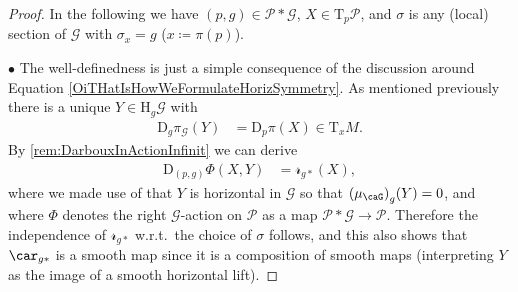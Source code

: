 \documentclass[reqno,a4paper,oneside]{amsart}
\newcommand\mutot{\mu_\caG}
\theoremstyle{plain}
\theoremstyle{remark}
\theoremstyle{definition}
\begin{document}
\begin{proof}
\leavevmode\newline
In the following we have $(p, g) \in \mathcal{P} * \mathcal{G}$, $X \in \mathrm{T}_p \mathcal{P}$, and $\sigma$ is any (local) section of $\mathcal{G}$ with $\sigma_x = g$ ($x \coloneqq \pi(p)$).

$\bullet$ The well-definedness is just a simple consequence of the discussion around Equation \eqref{OiTHatIsHowWeFormulateHorizSymmetry}. As mentioned previously there is a unique $Y \in \mathrm{H}_g\mathcal{G}$ with
\begin{align*}
\mathrm{D}_g\pi_{\mathcal{G}}(Y)
&=
\mathrm{D}_p\pi(X)
\in
\mathrm{T}_x M.
\end{align*}
By \ref{rem:DarbouxInActionInfinit} we can derive
\begin{align*}
\mathrm{D}_{(p, g)}\Phi(X,Y)
&=
\mathcal{r}_{g*}(X),
\end{align*}
where we made use of that $Y$ is horizontal in $\mathcal{G}$ so that $\mleft(\mutot\mright)_g(Y) = 0$, and where $\Phi$ denotes the right $\mathcal{G}$-action on $\mathcal{P}$ as a map $\mathcal{P}*\mathcal{G} \to \mathcal{P}$. Therefore the independence of $\mathcal{r}_{g*}$ w.r.t.\ the choice of $\sigma$ follows, and this also shows that $\car_{g*}$ is a smooth map since it is a composition of smooth maps (interpreting $Y$ as the image of a smooth horizontal lift).


\end{proof}
\end{document}

